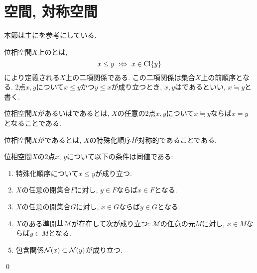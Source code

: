 \documentclass[uplatex, dvipdfmx, a4paper, 12pt, class=jsbook, crop=false]{standalone}
\begin{document}
\section{空間, 対称空間}
\label{sec:T0-spaces}

\newcommand{\topleq}{\leq}
\newcommand{\topindis}{\fallingdotseq}

\begin{source}
	本節は主に\cite[Chapter 16]{Schechter1997HAF}を参考にしている.
\end{source}

\begin{definition}
	位相空間$X$上のとは,
	\[ x \topleq y \defarw x \in \topcl \{y\} \]
	により定義される$X$上の二項関係である.
	この二項関係は集合$X$上の前順序となる.
	2点$x, y$について$x \leq y$かつ$y \leq x$が成り立つとき,
	$x, y$はであるといい,
	$x \topindis y$と書く.
\end{definition}

\begin{definition}
	位相空間$X$があるいはであるとは,
	$X$の任意の2点$x, y$について$x \topindis y$ならば$x = y$となることである.
\end{definition}

\begin{definition}
	位相空間$X$がであるとは, $X$の特殊化順序が対称的であることである.
\end{definition}

\begin{proposition}
	\label{05a202}
	\newcommand{\cM}{\mathcal{M}}
	位相空間$X$の2点$x$, $y$について以下の条件は同値である:
	\begin{enumerate}
		\item 特殊化順序について$x \leq y$が成り立つ.
		\item $X$の任意の閉集合$F$に対し, $y \in F$ならば$x \in F$となる.
		\item $X$の任意の開集合$G$に対し, $x \in G$ならば$y \in G$となる.
		\item $X$のある準開基$\cM$が存在して次が成り立つ: $\cM$の任意の元$M$に対し, $x \in M$ならば$y \in M$となる.
		\item 包含関係$\topnbd{x} \subset \topnbd{y}$が成り立つ.
	\end{enumerate}
	\qed
\end{proposition}
\end{document}
